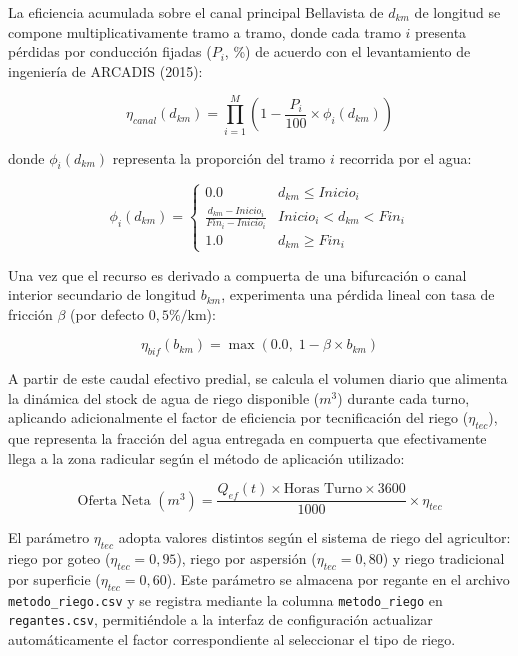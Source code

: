 \documentclass[12pt]{report}
\begin{document}
La eficiencia acumulada sobre el canal principal Bellavista de $d_{km}$ de longitud se compone multiplicativamente tramo a tramo, donde cada tramo $i$ presenta pérdidas por conducción fijadas ($P_i$, \%) de acuerdo con el levantamiento de ingeniería de ARCADIS (2015):

\begin{equation}
\eta_{canal}(d_{km}) = \prod_{i=1}^{M} \left( 1 - \frac{P_i}{100} \times \phi_i(d_{km}) \right)
\end{equation}

donde $\phi_i(d_{km})$ representa la proporción del tramo $i$ recorrida por el agua:

\begin{equation}
\phi_i(d_{km}) = \begin{cases} 
0.0 & d_{km} \le Inicio_i \\
\frac{d_{km} - Inicio_i}{Fin_i - Inicio_i} & Inicio_i < d_{km} < Fin_i \\
1.0 & d_{km} \ge Fin_i
\end{cases}
\end{equation}

Una vez que el recurso es derivado a compuerta de una bifurcación o canal interior secundario de longitud $b_{km}$, experimenta una pérdida lineal con tasa de fricción $\beta$ (por defecto $0,5\%/\text{km}$):

\begin{equation}
\eta_{bif}(b_{km}) = \max\left(0.0,\; 1 - \beta \times b_{km}\right)
\end{equation}

A partir de este caudal efectivo predial, se calcula el volumen diario que alimenta la dinámica del stock de agua de riego disponible ($m^3$) durante cada turno, aplicando adicionalmente el factor de eficiencia por tecnificación del riego ($\eta_{tec}$), que representa la fracción del agua entregada en compuerta que efectivamente llega a la zona radicular según el método de aplicación utilizado:

\begin{equation}
\text{Oferta Neta }(m^3) = \frac{Q_{ef}(t) \times \text{Horas Turno} \times 3600}{1000} \times \eta_{tec}
\end{equation}

El parámetro $\eta_{tec}$ adopta valores distintos según el sistema de riego del agricultor: riego por goteo ($\eta_{tec}=0{,}95$), riego por aspersión ($\eta_{tec}=0{,}80$) y riego tradicional por superficie ($\eta_{tec}=0{,}60$). Este parámetro se almacena por regante en el archivo \texttt{metodo\_riego.csv} y se registra mediante la columna \texttt{metodo\_riego} en \texttt{regantes.csv}, permitiéndole a la interfaz de configuración actualizar automáticamente el factor correspondiente al seleccionar el tipo de riego.
\end{document}

